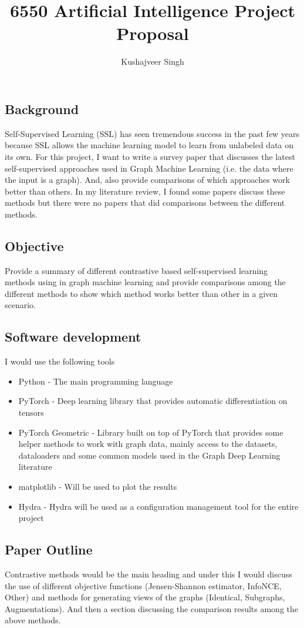 \documentclass[12pt,a4paper]{article}
\title{6550 Artificial Intelligence Project Proposal}
\author{Kushajveer Singh}
\date{}
\begin{document}
\maketitle

\subsection*{Background}
Self-Supervised Learning (SSL) has seen tremendous success in the past few years because SSL allows the machine learning model to learn from unlabeled data on its own. For this project, I want to write a survey paper that discusses the latest self-supervised approaches used in Graph Machine Learning (i.e. the data where the input is a graph). And, also provide comparisons of which approaches work better than others. In my literature review, I found some papers discuss these methods but there were no papers that did comparisons between the different methods.

\subsection*{Objective}
Provide a summary of different contrastive based self-supervised learning methods using in graph machine learning and provide comparisons among the different methods to show which method works better than other in a given scenario.

\subsection*{Software development}
I would use the following tools 
\begin{itemize}
    \item Python - The main programming language
    \item PyTorch - Deep learning library that provides automatic differentiation on tensors
    \item PyTorch Geometric - Library built on top of PyTorch that provides some helper methods to work with graph data, mainly access to the datasets, dataloaders and some common models used in the Graph Deep Learning literature
    \item matplotlib - Will be used to plot the results
    \item Hydra - Hydra will be used as a configuration management tool for the entire project
\end{itemize}

\subsection*{Paper Outline}
Contrastive methods would be the main heading and under this I would discuss the use of different objective functions (Jensen-Shannon estimator, InfoNCE, Other) and methods for generating views of the graphs (Identical, Subgraphs, Augmentations). And then a section discussing the comparison results among the above methods.
\end{document}
